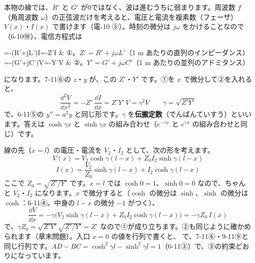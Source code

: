 \label{ph:電-13:sec9}
本物の線では、$R'$ と $G'$ が0ではなく、波は進むうちに弱まります。周波数 $f$（角周波数 $\omega$）の正弦波だけを考えると、電圧と電流を複素数（フェーザ）$V(x)$・$I(x)$ で書けます（電-10 ③）。時刻の微分は $j\omega$ をかけることなので（6-10⑩）、電信方程式は
\begin{bkhenkei}[0.5]
=-(R'+j\omega L')I=-Z'I & ①。$Z'=R'+j\omega L'$（1 m あたりの直列のインピーダンス） \\
=-(G'+j\omega C')V=-Y'V & ②。$Y'=G'+j\omega C'$（1 m あたりの並列のアドミタンス） \\
\end{bkhenkei}
になります。7-11⑥の $z$・$y$ が、この $Z'$・$Y'$ です。①を $x$ で微分して②を入れると、
\[\frac{\dd^2V}{\dd x^2}=-Z'\,\frac{\dd I}{\dd x}=Z'Y'\,V=\gamma^2V\qquad\gamma=\sqrt{Z'Y'}\]
で、6-11⑤の $y''=a^2y$ と同じ形です。$\gamma$ を\textbf{伝搬定数}（でんぱんていすう）といいます。答えは $\cosh\gamma x$ と $\sinh\gamma x$ の組み合わせ（$e^{-\gamma x}$ と $e^{\gamma x}$ の組み合わせと同じ）です。

線の先（$x=l$）の電圧・電流を $V_2$・$I_2$ として、次の形を考えます。
\[V(x)=V_2\cosh\gamma(l-x)+Z_0I_2\sinh\gamma(l-x)\]
\[I(x)=\frac{V_2}{Z_0}\sinh\gamma(l-x)+I_2\cosh\gamma(l-x)\]
ここで $Z_0=\sqrt{Z'/Y'}$ です。$x=l$ では $\cosh0=1$、$\sinh0=0$ なので、ちゃんと $V_2$・$I_2$ になります。$x$ で微分すると（$\cosh$ の微分は $\sinh$、$\sinh$ の微分は $\cosh$：6-11④。中身の $l-x$ の微分 $-1$ がつく）、
\[\frac{\dd V}{\dd x}=-\gamma\bigl(V_2\sinh\gamma(l-x)+Z_0I_2\cosh\gamma(l-x)\bigr)=-\gamma Z_0\,I(x)\]
で、$\gamma Z_0=\sqrt{Z'Y'}\sqrt{Z'/Y'}=Z'$ なので①が成り立ちます。②も同じように確かめられます（章末問題）。入口 $x=0$ の値を行列で書くと、
\label{ph:電-13:cosh}で、7-11⑥・9-11⑨と同じ行列です。$AD-BC=\cosh^2\gamma l-\sinh^2\gamma l=1$（6-11③）で、③の約束どおりになっています。

